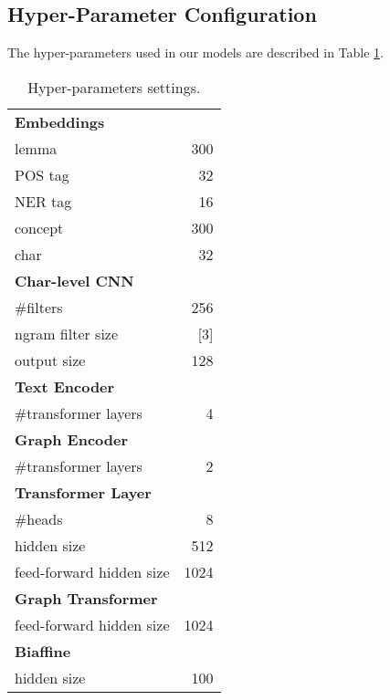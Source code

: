 \documentclass[11pt,a4paper]{article}
\begin{document}
\subsection{Hyper-Parameter Configuration}
\label{app:hyper-parameter}

The hyper-parameters used in our models are described in Table \ref{tbl:hyper-param}. 

\begin{table}[htbp!]
	\centering\small
	\begin{tabular}{lr}
		\hline
		\multicolumn{2}{l}{\textbf{Embeddings}} \\
		lemma & 300 \\
		POS tag& 32 \\
		NER tag & 16 \\
		concept & 300 \\
		char & 32 \\
		\hline
		\multicolumn{2}{l}{\textbf{Char-level CNN}} \\
		\#filters & 256 \\
		ngram filter size & [3] \\
		output size & 128 \\
		\hline
		\multicolumn{2}{l}{\textbf{Text Encoder}} \\
		\#transformer layers & 4 \\
		\hline
		\multicolumn{2}{l}{\textbf{Graph Encoder}} \\
		\#transformer layers & 2 \\
		\hline
		\multicolumn{2}{l}{\textbf{Transformer Layer}} \\
		\#heads & 8 \\
		hidden size & 512 \\
		feed-forward hidden size & 1024 \\
		\hline
		\multicolumn{2}{l}{\textbf{Graph Transformer}} \\
		feed-forward hidden size & 1024 \\
		\hline
		\multicolumn{2}{l}{\textbf{Biaffine}} \\
		hidden size & 100 \\
		\hline
	\end{tabular}
	\caption{Hyper-parameters settings. }
	\label{tbl:hyper-param}
\end{table}





 
\end{document}
